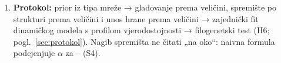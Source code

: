 \begin{kljucno}
\begin{enumerate}[leftmargin=1.6em]
\item \textbf{Protokol:} prior iz tipa mreže → gladovanje prema veličini, spremište po strukturi prema veličini i unos hrane prema veličini → zajednički fit dinamičkog modela s profilom vjerodostojnosti → filogenetski test (H6; pogl.~\ref{sec:protokol}). Nagib spremišta ne čitati „na oko“: naivna formula podcjenjuje $\alpha$ za \NaiveBiasMin–\NaiveBiasMax{} (S4).
\end{enumerate}
\end{kljucno}
